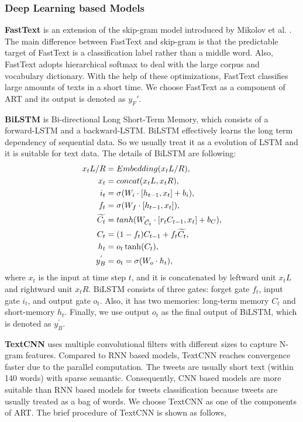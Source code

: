 \subsubsection{Deep Learning based Models}

\textbf{FastText} \cite{DBLP:journals/tacl/BojanowskiGJM17, DBLP:journals/corr/JoulinGBDJM16, DBLP:conf/eacl/GraveMJB17} is an extension of the skip-gram model introduced by Mikolov et al. \cite{DBLP:conf/nips/MikolovSCCD13}. The main difference between FastText and skip-gram is that the predictable target of FastText is a classification label rather than a middle word. Also, FastText adopts hierarchical softmax to deal with the large corpus and vocabulary dictionary. With the help of these optimizations, FastText classifies large amounts of texts in a short time. We choose FastText as a component of ART and its output is denoted as $y_F'$.

\textbf{BiLSTM} \cite{DBLP:journals/neco/HochreiterS97} is Bi-directional Long Short-Term Memory, which consists of a forward-LSTM and a backward-LSTM. BiLSTM effectively learns the long term dependency of sequential data. So we usually treat it as a evolution of LSTM and it is suitable for text data. The details of BiLSTM are following:
\begin{align}\label{eq:lstm}
x_tL/R &= Embedding(x_tL/R), \\
x_t &= concat(x_tL, x_tR), \\
i_t &= \sigma(W_i \cdot [h_{t-1}, x_t] + b_i),\\
f_t &= \sigma(W_f \cdot [h_{t-1}, x_t]),\\
\widetilde{C_t} &= tanh(W_{\tilde{C_t}} \cdot [r_t C_{t-1}, x_t]  + b_C),\\
C_t &= (1-f_t) C_{t-1} + f_t \widetilde{C_t},\\
h_t &=o_t \* \tanh(C_t),\\
y_B^{'} &= o_t =  \sigma(W_o \cdot h_t),
\end{align}
where $x_t$ is the input at time step $t$, and it is concatenated by leftward unit $x_tL$ and rightward unit $x_tR$. BiLSTM consists of three gates: forget gate $f_t$, input gate $i_t$, and output gate $o_t$. Also, it has two memories: long-term memory $C_t$ and short-memory $h_t$. Finally, we use output $o_t$ as the final output of BiLSTM, which is denoted as $y_B^{'}$.

\textbf{TextCNN} \cite{DBLP:conf/emnlp/Kim14} uses multiple convolutional filters with different sizes to capture N-gram features. Compared to RNN based models, TextCNN reaches convergence faster due to the parallel computation. The tweets are usually short text (within 140 words) with sparse semantic. Consequently, CNN based models are more suitable than RNN based models for tweets classification because tweets are usually treated as a bag of words. We choose TextCNN as one of the components of ART. The brief procedure of TextCNN is shown as follows,

